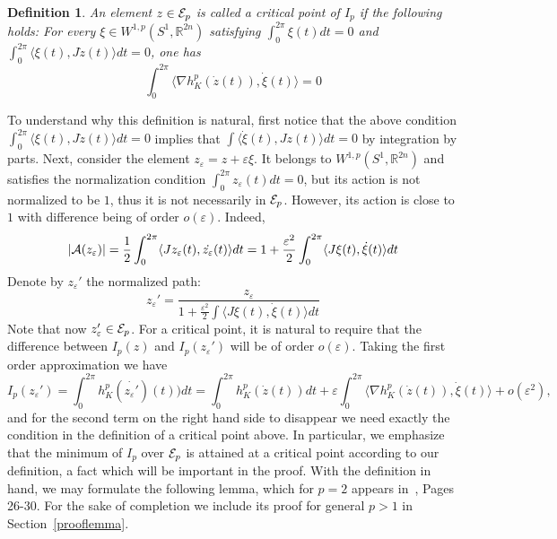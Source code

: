 \documentclass[12pt]{article}
\newtheorem{definition}[lemma]{Definition}
\def\R{{\mathbb R}}
\def\eps{\varepsilon}
\begin{document}
\begin{definition} \label{def-crit-pt}
An element $z \in {\cal E}_p$ is called a critical point of $I_p$ if
the following holds: For every $\xi \in W^{1,p}(S^1, \R^{2n})$
satisfying $\int_0^{2 \pi} \xi(t)dt = 0$ and $\int_0^{2 \pi} \langle
\xi(t), J \dot{z}(t)\rangle dt = 0$, one has
\[ \int_0^{2 \pi} \langle \nabla h_K^p(\dot{z}(t)),
\dot{\xi} (t) \rangle = 0 \]
\end{definition}


To understand why this definition is natural, first notice that
 the above
condition $\int_0^{2 \pi} \langle \xi(t), J \dot{z}(t)  \rangle dt =
0$ implies that $\int \langle \dot{\xi}(t), J {z} (t)  \rangle dt =
0$ by  integration by parts. Next, consider the element $z_{\eps} =
z + \eps \xi$. It belongs to $W^{1,p}(S^1, \R^{2n})$ and satisfies
the normalization condition $\int_0^{2 \pi} z_{\eps}(t)dt = 0$, but
its action is not normalized to be $1$, thus it is not necessarily
in ${\cal E}_p$. However, its action is close to $1$ with difference
being of order $o(\eps)$. Indeed,
\[ |{\cal A}(z_{\eps}) | = {\frac 1 2} \int_0^{2 \pi}
\langle Jz_{\eps}(t), \dot{z_{\eps}}(t)
\rangle dt =  1 + {\frac {\eps^2} {2}} \int_0^{2 \pi} \langle J
\xi(t), \dot \xi (t) \rangle dt \]
Denote by $z_{\eps}'$ the normalized path:
\[ z_{\eps}' = {\frac {z_{\eps}} {1+ {\frac {\eps^2} {2}} \int \langle J\xi(t) ,
\dot{\xi}(t) \rangle dt}}\] Note that now $z_{\eps}' \in {\cal
E}_p$. For a critical point, it is natural to require that the
difference between $I_p(z)$ and $I_p(z_{\eps}')$ will be of order
$o(\eps)$. Taking the first order approximation we have
\[ I_p(z_{\eps}') =
\int_0^{2 \pi} h_K^p ({\dot{z_{\eps}'}})(t))dt  = \int_0^{2 \pi}
h_K^p(\dot{z}(t))dt  + \eps \int_0^{2 \pi} \langle \nabla
h_K^p(\dot{z}(t)), \dot{\xi} (t) \rangle  + o({\eps^2}),\] and for
the second term on the right hand side to disappear we need exactly
the condition in the definition of a critical point above. In
particular, we emphasize that the minimum of $I_p$ over ${\cal E}_p$ is
attained at a critical point according to our definition, a fact
which will be important in the proof. With the definition in hand,
we may formulate the following lemma, which for $p=2$ appears
in~\cite{HZ}, Pages 26-30. For the sake of completion we include its
proof for general $p>1$ in Section~\ref{prooflemma}.
\end{document}
